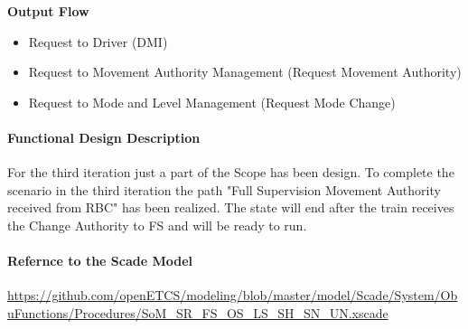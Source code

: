 \textbf{Output Flow}
\begin{itemize}
\item Request to Driver (DMI)
\item Request to Movement Authority Management (Request Movement Authority)
\item Request to Mode and Level Management (Request Mode Change)
\end{itemize}


\paragraph{Functional Design Description}
For the third iteration just a part of the Scope has been design. To complete the scenario in the third iteration the path "Full Supervision Movement Authority received from RBC" has been realized. The state will end after the train receives the Change Authority to FS and will be ready to run.

\paragraph{Refernce to the Scade Model}
\url{https://github.com/openETCS/modeling/blob/master/model/Scade/System/ObuFunctions/Procedures/SoM_SR_FS_OS_LS_SH_SN_UN.xscade}

